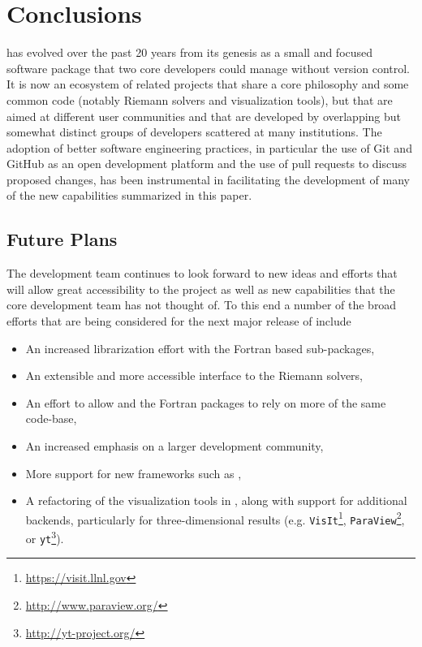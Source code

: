 %
%
%

\section{Conclusions} \label{sec:conclusions}

\clawpack has evolved over the past 20 years from its genesis as a small and
focused software package that two core developers could manage without
version control.  It is now an ecosystem of related projects that share a core
philosophy and some common code (notably Riemann solvers and visualization
tools), but that are aimed at different user
communities and that are developed by overlapping but somewhat distinct
groups of developers scattered at many institutions.  The adoption of better
software engineering practices, in particular the use of Git and GitHub as an
open development platform and the use of pull requests to discuss proposed
changes, has been instrumental in facilitating the development of many of the
new capabilities summarized in this paper.  

\subsection{Future Plans} \label{sub:future}

The \clawpack development team continues to look forward to new ideas and
efforts that will allow great accessibility to the project as well as new
capabilities that the core development team has not thought of.  To this end a
number of the broad efforts that are being considered for the next major release
of \clawpack include
\begin{itemize}
    \item An increased librarization effort with the Fortran based sub-packages,
    \item An extensible and more accessible interface to the Riemann solvers,
    \item An effort to allow \pyclaw and the \clawpack Fortran packages to rely
    on more of the same code-base,
    \item An increased emphasis on a larger development community,
    \item More support for new frameworks such as \forestclaw,
    \item A refactoring of the visualization tools in \visclaw, along with
    support for additional backends, particularly for three-dimensional results
    (e.g.
\texttt{VisIt}\footnote{\url{https://visit.llnl.gov}}, 
\texttt{ParaView}\footnote{\url{http://www.paraview.org/}}, or 
\texttt{yt}\footnote{\url{http://yt-project.org/}}).
\end{itemize}
